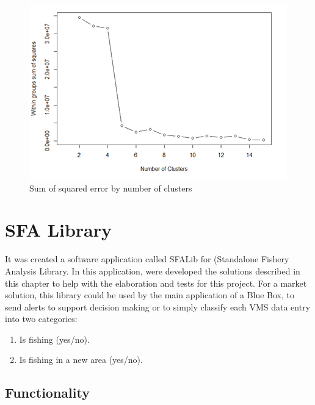 \begin{figure}[]
\centering
\includegraphics[width=0.8\linewidth]{Chapters/img/elbow_method.png}
\caption{Sum of squared error by number of clusters}
\label{fig:elbow_method}
\end{figure}






\section{SFA Library} %
\label{sub:sfa_library}

It was created a software application called SFALib for (Standalone Fishery Analysis Library. In this application, were developed the solutions described in this chapter to help with the elaboration and tests for this project. For a market solution, this library could be used by the main application of a Blue Box, to send alerts to support decision making or to simply classify each VMS data entry into two categories:
\begin{enumerate}
\item Is fishing (yes/no).
\item Is fishing in a new area (yes/no).
\end{enumerate}



\subsection{Functionality} %
\label{sub:functionality}

